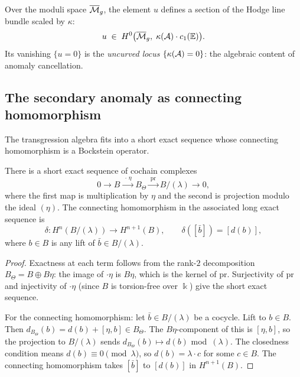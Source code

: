 \begin{remark}
\label{rem:g9-u-characteristic}
Over the moduli space $\overline{\mathcal{M}}_g$, the element $u$ defines a
section of the Hodge line bundle scaled by $\kappa$:
\[
u \;\in\; H^0\bigl(\overline{\mathcal{M}}_g,\;
\kappa(\mathcal{A}) \cdot c_1(\mathbb{E})\bigr).
\]
Its vanishing $\{u = 0\}$ is the
\emph{uncurved locus} $\{\kappa(\mathcal{A}) = 0\}$: the algebraic
content of anomaly cancellation.
\end{remark}

%
%

\subsection{The secondary anomaly as connecting homomorphism}
\label{subsec:secondary-connecting}

The transgression algebra fits into a short exact sequence whose
connecting homomorphism is a Bockstein operator.

\begin{proposition}
\label{prop:g9-ses-transgression}
There is a short exact sequence of cochain complexes
\begin{equation}\label{eq:g9-ses}
0 \longrightarrow
B \xrightarrow{\;\cdot\,\eta\;}
B_\Theta
\xrightarrow{\;\mathrm{pr}\;}
B / (\lambda)
\longrightarrow 0,
\end{equation}
where the first map is multiplication by $\eta$ and the second is
projection modulo the ideal $(\eta)$. The connecting homomorphism
in the associated long exact sequence is
\begin{equation}\label{eq:g9-connecting}
\delta\colon H^n(B/(\lambda)) \longrightarrow H^{n+1}(B),
\qquad
\delta([\bar{b}]) = [d(b)],
\end{equation}
where $b \in B$ is any lift of $\bar{b} \in B/(\lambda)$.
\end{proposition}

\begin{proof}
Exactness at each term follows from the rank-$2$ decomposition
$B_\Theta = B \oplus B\eta$: the image of $\cdot\eta$ is $B\eta$,
which is the kernel of $\mathrm{pr}$. Surjectivity of $\mathrm{pr}$
and injectivity of $\cdot\eta$ (since $B$ is torsion-free over
$\Bbbk$) give the short exact sequence.

For the connecting homomorphism: let $\bar{b} \in B/(\lambda)$ be a
cocycle. Lift to $b \in B$. Then
$d_{B_\Theta}(b) = d(b) + [\eta, b] \in B_\Theta$. The
$B\eta$-component of this is $[\eta, b]$, so the projection to
$B/(\lambda)$ sends $d_{B_\Theta}(b) \mapsto d(b)$ mod~$(\lambda)$.
The closedness condition means $d(b) \equiv 0 \pmod{\lambda}$, so
$d(b) = \lambda \cdot c$ for some $c \in B$. The connecting
homomorphism takes $[\bar{b}]$ to $[d(b)]$ in $H^{n+1}(B)$.
\end{proof}

